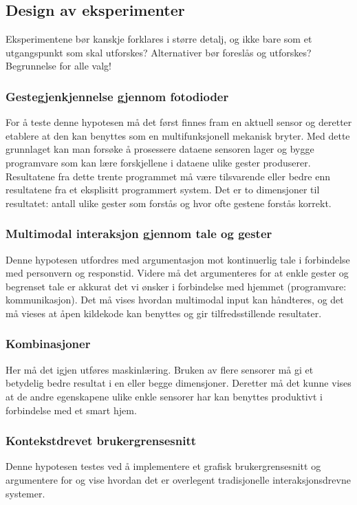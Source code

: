 \subsection{Design av eksperimenter}
{\color{red}Eksperimentene bør kanskje forklares i større detalj, og ikke bare som et utgangspunkt som skal utforskes? Alternativer bør foreslås og utforskes? Begrunnelse for alle valg!}
\subsubsection*{Gestegjenkjennelse gjennom fotodioder}
For å teste denne hypotesen må det først finnes fram en aktuell sensor og deretter etablere at den kan benyttes som en multifunksjonell mekanisk bryter. Med dette grunnlaget kan man forsøke å prosessere dataene sensoren lager og bygge programvare som kan lære forskjellene i dataene ulike gester produserer. Resultatene fra dette trente programmet må være tilsvarende eller bedre enn resultatene fra et eksplisitt programmert system. Det er to dimensjoner til resultatet: antall ulike gester som forstås og hvor ofte gestene forstås korrekt.

\subsubsection*{Multimodal interaksjon gjennom tale og gester}
Denne hypotesen utfordres med argumentasjon mot kontinuerlig tale i forbindelse med personvern og responstid. Videre må det argumenteres for at enkle gester og begrenset tale er akkurat det vi ønsker i forbindelse med hjemmet (programvare: kommunikasjon). Det må vises hvordan multimodal input kan håndteres, og det må vieses at åpen kildekode kan benyttes og gir tilfredsstillende resultater.

\subsubsection*{Kombinasjoner}
Her må det igjen utføres maskinlæring. Bruken av flere sensorer må gi et betydelig bedre resultat i en eller begge dimensjoner. Deretter må det kunne vises at de andre egenskapene ulike enkle sensorer har kan benyttes produktivt i forbindelse med et smart hjem.

\subsubsection*{Kontekstdrevet brukergrensesnitt}
Denne hypotesen testes ved å implementere et grafisk brukergrensesnitt og argumentere for og vise hvordan det er overlegent tradisjonelle interaksjonsdrevne systemer.





